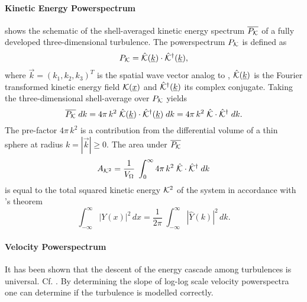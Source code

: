 \paragraph{Kinetic Energy Powerspectrum}
\newcommand{\pekin}{P_{\ekin}}

 shows the schematic of the shell-averaged
kinetic energy spectrum $\overline{\pekin}$ of a fully developed three-dimensional
turbulence. The powerspectrum $\pekin$ is defined as
\begin{equation}
    \pekin = \hat{\ekin}(\vec{k}) \cdot \hat{\ekin}^{\dagger}(\vec{k}),
\end{equation}
where $\vec{k} = (k_1,k_2,k_3)^T$  is the spatial wave vector analog to
, $\hat{\mathcal{K}}(\underline{k})$ is the Fourier transformed kinetic
energy field $\mathcal{K}(\underline{x})$ and $\hat{\mathcal{K}}^{\dagger}(\underline{k})$ its complex
conjugate.  Taking the three-dimensional shell-average over $\pekin$
yields
\begin{equation}
\label{eqn:pws-ekin}
    \overline{\pekin} \; dk = 4\pi\,k^2 \; \hat{\ekin}(\vec{k}) \cdot \hat{\ekin}^{\dagger}(\vec{k}) \; dk
        = 4\pi\,k^2 \; \hat{\ekin} \cdot \hat{\ekin}^{\dagger} \; dk
.
\end{equation}
The pre-factor $4 \pi\,k^2$ is a contribution from the differential volume of a
thin sphere at radius $k = |\vec{k}| \ge 0$.  The area under
$\overline{\pekin}$
\begin{equation}
    A_{\mathcal{K}^2} = \frac{1}{V_{\Omega}} \; \int_0^\infty 4\pi\,k^2 \; \hat{\mathcal{K}} \cdot \hat{\mathcal{K}}^{\dagger} \; dk
\end{equation}
is equal to the total squared kinetic energy $\mathcal{K}^2$ of the system in
accordance with 's theorem
\begin{equation}
    \int_{-\infty}^{\infty} |Y(x)|^2 \, dx = \frac{1}{2\pi} \; \int_{-\infty}^{\infty} |\hat{Y}(k)|^2 \,dk.
\end{equation}

\paragraph{Velocity Powerspectrum}
\label{sec:theory-powerspectrum}
\newcommand{\pvels}{P_{\vels}}
\newcommand{\pmvels}{P_{m\vels}}
It has been shown that the descent of the energy cascade among turbulences is
universal. Cf. \cite{federrath2013universality,she1994universal,boldyrev2002scaling,kitsionas2009algorithmic}.
By determining the slope of log-log scale velocity powerspectra one can
determine if the turbulence is modelled correctly.

